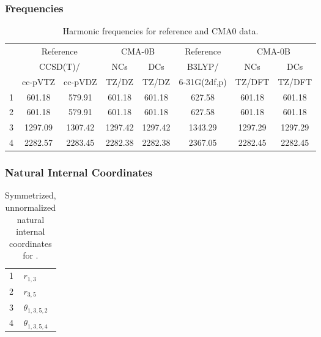 \documentclass[10pt,oneside]{article}
\begin{document}
\clearpage

\subsubsection*{Frequencies}
\begin{table}[h!]
\centering
\caption{Harmonic frequencies for reference and CMA0 data.}
\begin{tabular}{cccccccc}
\toprule
{} & \multicolumn{2}{c}{Reference} & \multicolumn{2}{c}{CMA-0B} &    Reference & \multicolumn{2}{c}{CMA-0B} \\
{} & \multicolumn{2}{c}{CCSD(T)/} &     NCs &     DCs &       B3LYP/ &     NCs &     DCs \\
{} &   cc-pVTZ & cc-pVDZ &   TZ/DZ &   TZ/DZ & 6-31G(2df,p) &  TZ/DFT &  TZ/DFT \\
\midrule
1 &    601.18 &  579.91 &  601.18 &  601.18 &       627.58 &  601.18 &  601.18 \\
2 &    601.18 &  579.91 &  601.18 &  601.18 &       627.58 &  601.18 &  601.18 \\
3 &   1297.09 & 1307.42 & 1297.42 & 1297.42 &      1343.29 & 1297.29 & 1297.29 \\
4 &   2282.57 & 2283.45 & 2282.38 & 2282.38 &      2367.05 & 2282.45 & 2282.45 \\
\bottomrule
\end{tabular}
\end{table}

\clearpage

\subsubsection*{Natural Internal Coordinates}
\begin{table}[h!]
\centering
\caption{Symmetrized, unnormalized natural internal coordinates for .}
\small
\begin{tabular}{ll}
  1   & $r_{1,3}$ \\
  2   & $r_{3,5}$ \\
  3   & $\theta_{1,3,5,2}$ \\
  4   & $\theta_{1,3,5,4}$ \\
\end{tabular}
\end{table}

\clearpage

\subsection{\ \ \ }
\end{document}
